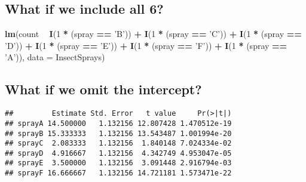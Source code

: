\documentclass[12pt,openright,oneside,a4paper,chapter=TITLE,section=TITLE,subsection=Title,english,french,spanish,portugues,sumario=tradicional]{04-class-files/abntex2}
\newenvironment{Shaded}{\begin{snugshade}}{\end{snugshade}}
\newcommand{\DataTypeTok}[1]{\textcolor[rgb]{0.13,0.29,0.53}{#1}}
\newcommand{\DecValTok}[1]{\textcolor[rgb]{0.00,0.00,0.81}{#1}}
\newcommand{\KeywordTok}[1]{\textcolor[rgb]{0.13,0.29,0.53}{\textbf{#1}}}
\newcommand{\NormalTok}[1]{#1}
\newcommand{\OperatorTok}[1]{\textcolor[rgb]{0.81,0.36,0.00}{\textbf{#1}}}
\newcommand{\StringTok}[1]{\textcolor[rgb]{0.31,0.60,0.02}{#1}}
\begin{document}
\hypertarget{what-if-we-include-all-6}{%
\subsection{What if we include all 6?}\label{what-if-we-include-all-6}}

\begin{Shaded}
\begin{Highlighting}[]
\KeywordTok{lm}\NormalTok{(count }\OperatorTok{~}\StringTok{ }
\StringTok{   }\KeywordTok{I}\NormalTok{(}\DecValTok{1} \OperatorTok{*}\StringTok{ }\NormalTok{(spray }\OperatorTok{==}\StringTok{ 'B'}\NormalTok{)) }\OperatorTok{+}\StringTok{ }\KeywordTok{I}\NormalTok{(}\DecValTok{1} \OperatorTok{*}\StringTok{ }\NormalTok{(spray }\OperatorTok{==}\StringTok{ 'C'}\NormalTok{)) }\OperatorTok{+}\StringTok{  }
\StringTok{   }\KeywordTok{I}\NormalTok{(}\DecValTok{1} \OperatorTok{*}\StringTok{ }\NormalTok{(spray }\OperatorTok{==}\StringTok{ 'D'}\NormalTok{)) }\OperatorTok{+}\StringTok{ }\KeywordTok{I}\NormalTok{(}\DecValTok{1} \OperatorTok{*}\StringTok{ }\NormalTok{(spray }\OperatorTok{==}\StringTok{ 'E'}\NormalTok{)) }\OperatorTok{+}
\StringTok{   }\KeywordTok{I}\NormalTok{(}\DecValTok{1} \OperatorTok{*}\StringTok{ }\NormalTok{(spray }\OperatorTok{==}\StringTok{ 'F'}\NormalTok{)) }\OperatorTok{+}\StringTok{ }\KeywordTok{I}\NormalTok{(}\DecValTok{1} \OperatorTok{*}\StringTok{ }\NormalTok{(spray }\OperatorTok{==}\StringTok{ 'A'}\NormalTok{)), }\DataTypeTok{data =}\NormalTok{ InsectSprays)}
\end{Highlighting}
\end{Shaded}

\hypertarget{what-if-we-omit-the-intercept}{%
\subsection{What if we omit the intercept?}\label{what-if-we-omit-the-intercept}}

\begin{Shaded}
\end{Shaded}

\begin{verbatim}
##         Estimate Std. Error   t value     Pr(>|t|)
## sprayA 14.500000   1.132156 12.807428 1.470512e-19
## sprayB 15.333333   1.132156 13.543487 1.001994e-20
## sprayC  2.083333   1.132156  1.840148 7.024334e-02
## sprayD  4.916667   1.132156  4.342749 4.953047e-05
## sprayE  3.500000   1.132156  3.091448 2.916794e-03
## sprayF 16.666667   1.132156 14.721181 1.573471e-22
\end{verbatim}
\end{document}
